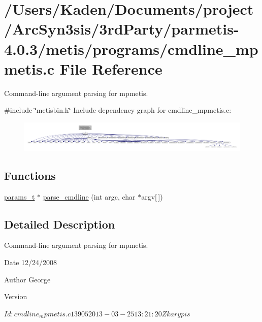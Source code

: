 \hypertarget{a00302}{}\section{/\+Users/\+Kaden/\+Documents/project/\+Arc\+Syn3sis/3rd\+Party/parmetis-\/4.0.3/metis/programs/cmdline\+\_\+mpmetis.c File Reference}
\label{a00302}


Command-\/line argument parsing for mpmetis.  


{\ttfamily \#include \char`\"{}metisbin.\+h\char`\"{}}\newline
Include dependency graph for cmdline\+\_\+mpmetis.\+c\+:\nopagebreak
\begin{figure}[H]
\begin{center}
\leavevmode
\includegraphics[width=350pt]{a00303}
\end{center}
\end{figure}
\subsection*{Functions}
\begin{DoxyCompactItemize}
\item 
\hyperlink{a00706}{params\+\_\+t} $\ast$ \hyperlink{a00302_a0e7ce196a2f8882777957bf898739f6f}{parse\+\_\+cmdline} (int argc, char $\ast$argv\mbox{[}$\,$\mbox{]})
\end{DoxyCompactItemize}


\subsection{Detailed Description}
Command-\/line argument parsing for mpmetis. 

\begin{DoxyDate}{Date}
12/24/2008 
\end{DoxyDate}
\begin{DoxyAuthor}{Author}
George 
\end{DoxyAuthor}
\begin{DoxyVersion}{Version}
\begin{DoxyVerb}$Id: cmdline_mpmetis.c 13905 2013-03-25 13:21:20Z karypis $\end{DoxyVerb}
 
\end{DoxyVersion}


